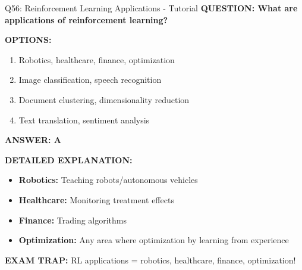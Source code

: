 \documentclass[8pt]{beamer}
\begin{document}
	\begin{frame}{Q56: Reinforcement Learning Applications - Tutorial}
		\fontsize{6.5}{7.5}\selectfont
		\textbf{QUESTION: What are applications of reinforcement learning?}
		
		\vspace{0.1cm}
		\textbf{OPTIONS:}
		\begin{enumerate}
			\item Robotics, healthcare, finance, optimization
			\item Image classification, speech recognition
			\item Document clustering, dimensionality reduction
			\item Text translation, sentiment analysis
		\end{enumerate}
		
		\vspace{0.1cm}
		\textcolor{myblue}{\textbf{ANSWER: A}}
		
		\vspace{0.1cm}
		\textbf{DETAILED EXPLANATION:}
		\begin{itemize}
			\item \textbf{Robotics:} Teaching robots/autonomous vehicles
			\item \textbf{Healthcare:} Monitoring treatment effects
			\item \textbf{Finance:} Trading algorithms
			\item \textbf{Optimization:} Any area where optimization by learning from experience
		\end{itemize}
		
		\vspace{0.1cm}
		\textcolor{myred}{\textbf{EXAM TRAP:}} RL applications = \textcolor{myblue}{robotics, healthcare, finance, optimization}!
	\end{frame}
	
\end{document}
